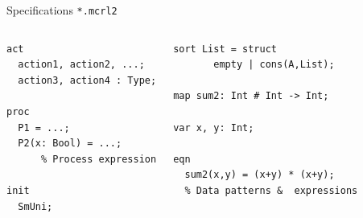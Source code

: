 \documentclass[aspectratio=169]{beamer}
\begin{document}



\begin{frame}[fragile]{Specifications \texttt{*.mcrl2}}

\begin{columns}
  \begin{lstlisting}
act
  action1, action2, ...;
  action3, action4 : Type;

proc
  P1 = ...;
  P2(x: Bool) = ...;
      % Process expression

init
  SmUni;
\end{lstlisting}
  \begin{lstlisting}
sort List = struct
       empty | cons(A,List);

map sum2: Int # Int -> Int;

var x, y: Int;

eqn 
  sum2(x,y) = (x+y) * (x+y);
  % Data patterns &  expressions

\end{lstlisting}
\end{columns}


\end{frame}
\end{document}
